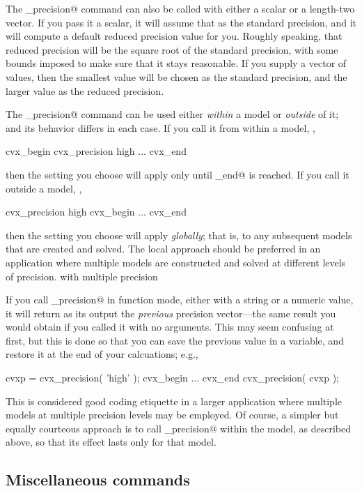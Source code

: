 \documentclass[12pt]{article}
\begin{document}
The \verb@cvx_precision@ command can also be called with either a scalar or a
length-two vector. If you pass it a scalar, it will assume that as the standard
precision, and it will compute a default reduced precision value for you.
Roughly speaking, that reduced precision will be the square root of the standard
precision, with some bounds imposed to make sure that it stays reasonable. If
you supply a vector of values, then the smallest value will be chosen as
the standard precision, and the larger value as the reduced precision.

The \verb@cvx_precision@ command can be used either \emph{within} a \cvx model or
\emph{outside} of it; and its behavior differs in each case. If you call it from
within a model, \eg,
\begin{code}
	cvx_begin
	    cvx_precision high
	    ...
	cvx_end
\end{code}
then the setting you choose will apply only until \verb@cvx_end@ is reached. If you call it outside
a model, \eg,
\begin{code}
	cvx_precision high
	cvx_begin
	    ...
	cvx_end
\end{code}
then the setting you choose will apply \emph{globally}; that is, to any
subsequent models that are created and solved. The local approach should be
preferred in an application where multiple models are constructed and solved
at different levels of precision.
with multiple precision

If you call \verb@cvx_precision@ in function mode, either with a string or a numeric
value, it will return as its output the \emph{previous} precision vector---the same
result you would obtain if you called it with no arguments. This may
seem confusing at first, but this is done so that you can save the previous value
in a variable, and restore it at the end of your calcuations; e.g.,
\begin{code}
	cvxp = cvx_precision( 'high' );
	cvx_begin
		...
	cvx_end
	cvx_precision( cvxp );
\end{code}
This is considered good coding etiquette in a larger application where multiple 
\cvx models at multiple precision levels may be employed. Of course, a simpler but
equally courteous approach is to call \verb@cvx_precision@ within the \cvx
model, as described above, so that its effect lasts only for that model.

\subsection{Miscellaneous \cvx commands}
\end{document}

